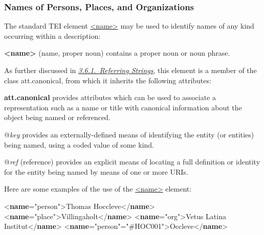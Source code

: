 \subsubsection[{Names of Persons, Places, and Organizations}]{Names of Persons, Places, and Organizations}\label{msnames}\par
The standard TEI element \hyperref[TEI.name]{<name>} may be used to identify names of any kind occurring within a description: 
\begin{sansreflist}
  
\item [\textbf{<name>}] (name, proper noun) contains a proper noun or noun phrase.
\end{sansreflist}
 As further discussed in \textit{\hyperref[CONARS]{3.6.1.\ Referring Strings}}, this element is a member of the class \textsf{att.canonical}, from which it inherits the following attributes: 
\begin{sansreflist}
  
\item [\textbf{att.canonical}] provides attributes which can be used to associate a representation such as a name or title with canonical information about the object being named or referenced.\hfil\\[-10pt]\begin{sansreflist}
    \item[@{\itshape key}]
  provides an externally-defined means of identifying the entity (or entities) being named, using a coded value of some kind.
    \item[@{\itshape ref}]
  (reference) provides an explicit means of locating a full definition or identity for the entity being named by means of one or more URIs.
\end{sansreflist}  
\end{sansreflist}
\par
Here are some examples of the use of the \hyperref[TEI.name]{<name>} element: \par\bgroup{}\exampleFont \begin{shaded}\noindent\mbox{}{<\textbf{name}\hspace*{1em}{type}="{person}">}Thomas Hoccleve{</\textbf{name}>}\mbox{}\newline 
{<\textbf{name}\hspace*{1em}{type}="{place}">}Villingaholt{</\textbf{name}>}\mbox{}\newline 
{<\textbf{name}\hspace*{1em}{type}="{org}">}Vetus Latina Institut{</\textbf{name}>}\mbox{}\newline 
{<\textbf{name}\hspace*{1em}{type}="{person}"\hspace*{1em}{ref}="{\#HOC001}">}Occleve{</\textbf{name}>}\end{shaded}\egroup\par \par
